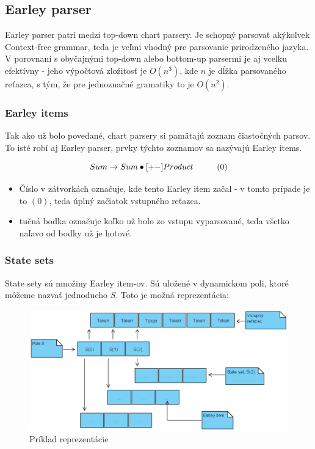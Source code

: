 \documentclass[12pt,a4paper]{report}
\theoremstyle{definition}
\theoremstyle{remark}
\newcommand\tab[1][1cm]{\hspace*{#1}}
\begin{document}
\subsection{Earley parser}
\label{sec:earley}

Earley parser\cite{Vaillant} patrí medzi top-down chart parsery. Je schopný parsovať akýkoľvek Context-free grammar, teda je veľmi vhodný pre parsovanie prirodzeného jazyka. V porovnaní s obyčajnými top-down alebo bottom-up parsermi je aj vcelku efektívny - jeho výpočtová zložitosť je $O(n^3)$, kde $n$ je dĺžka parsovaného reťazca, s tým, že pre jednoznačné gramatiky to je $O(n^2)$.

\subsubsection*{Earley items} 
Tak ako už bolo povedané, chart parsery si pamätajú zoznam čiastočných parsov. To isté robí aj Earley parser, prvky týchto zoznamov sa nazývajú Earley items.

$$ Sum \to Sum \bullet [+-] Product \tab  (0)  $$

\begin{itemize}
\item Číslo v zátvorkách označuje, kde tento Earley item začal - v tomto prípade je to $(0)$, teda úplný začiatok vstupného reťazca.
\item tučná bodka označuje koľko už bolo zo vstupu vyparsované, teda všetko naľavo od bodky už je hotové. 
\end{itemize}

\subsubsection*{State sets}

State sety sú množiny Earley item-ov. Sú uložené v dynamickom poli, ktoré môžeme nazvať jednoducho $S$. Toto je možná reprezentácia:

\begin{figure}[h]
\centering
\includegraphics[scale=0.75]{stateSet}
\caption{Príklad reprezentácie}
\end{figure}
\end{document}
